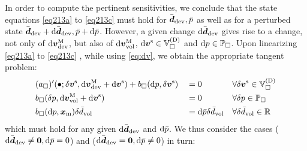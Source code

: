\documentclass[10pt,a4paper]{article}
\begin{document}
In order to compute the pertinent sensitivities, we conclude that the state equations \eqref{eq213a} to \eqref{eq213c} must hold
for $\bar{\boldsymbol{d}}_{\mathrm{dev}},\bar{p}$ as well as for a perturbed state $\bar{\boldsymbol{d}}_{\mathrm{dev}}+\operatorname{d \!}\bar{\boldsymbol{d}}_{\mathrm{dev}}, \bar{p}+\operatorname{d \!}\bar{p}$.
However, a given change $\operatorname{d \!}\bar{\boldsymbol{d}}_{\mathrm{dev}}$ gives rise to a change, not only of $\operatorname{d \!}\boldsymbol{v}^{\mathrm{M}}_{\mathrm{dev}}$,
but also of $\operatorname{d \!}\boldsymbol{v}^{\mathrm{M}}_{\mathrm{vol}}$, $\operatorname{d \!}\boldsymbol{v}^{\mathrm{s}}\in\mathbb{V}_\Box^{(\mathrm{D})}$ and $\operatorname{d \!} p\in\mathbb{P}_\Box$.
Upon linearizing \eqref{eq213a} to \eqref{eq213c} , while using \eqref{eq:dv}, we obtain the appropriate tangent problem:
\begin{align}
    &(a_\Box)'(\bullet;\delta\boldsymbol{v}^{\mathrm{s}},\operatorname{d \!}\boldsymbol{v}^{\mathrm{M}}_{\mathrm{dev}} + \operatorname{d \!}\boldsymbol{v}^{\mathrm{s}}) +
    b_\Box(\operatorname{d \!} p,\delta\boldsymbol{v}^{\mathrm{s}})
    && =
    0
    && \forall \delta \boldsymbol{v}^{\mathrm{s}}\in\mathbb{V}_\Box^{(\mathrm{D})}
 \\
    &b_\Box(\delta p,\operatorname{d \!}\boldsymbol{v}^{\mathrm{M}}_{\mathrm{vol}} + \operatorname{d \!}\boldsymbol{v}^{\mathrm{s}})
    && =
    0
    && \forall \delta p\in\mathbb{P}_\Box
\\
    &b_\Box(\operatorname{d \!} p,\boldsymbol{x}_{\mathrm{m}})\delta\bar{d}_{\mathrm{vol}}
    && =
    \operatorname{d \!}\bar{p}\delta\bar{d}_{\mathrm{vol}}
    && \forall \delta\bar{d}_{\mathrm{vol}}  \in \mathbb{R}
\end{align}
which must hold for any given $\operatorname{d \!}\bar{\boldsymbol{d}}_{\mathrm{dev}}$ and $\operatorname{d \!}\bar{p}$. We thus consider the cases ($\operatorname{d \!}\bar{\boldsymbol{d}}_{\mathrm{dev}}\neq \boldsymbol{0}, \operatorname{d \!}\bar{p}=0$) and ($\operatorname{d \!}\bar{\boldsymbol{d}}_{\mathrm{dev}}=\boldsymbol{0}, \operatorname{d \!}\bar{p}\neq 0$) in turn:
\end{document}
